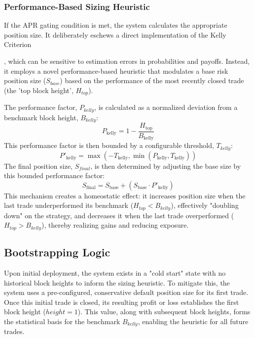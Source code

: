 \documentclass[11pt]{article}
\begin{document}
\subsubsection{Performance-Based Sizing Heuristic}
If the APR gating condition is met, the system calculates the appropriate position size. It deliberately eschews a direct implementation of the Kelly Criterion\cite{kelly1956new}{\cite{tharpinstitute_peak}, which can be sensitive to estimation errors in probabilities and payoffs. Instead, it employs a novel performance-based heuristic that modulates a base risk position size ($S_{base}$) based on the performance of the most recently closed trade (the 'top block height', $H_{top}$).

The performance factor, $P_{kelly}$, is calculated as a normalized deviation from a benchmark block height, $B_{kelly}$:
$$
P_{\text{kelly}} = 1 - \frac{H_{\text{top}}}{B_{\text{kelly}}}
$$
This performance factor is then bounded by a configurable threshold, $T_{kelly}$:
$$
P'_{\text{kelly}} = \max(-T_{\text{kelly}}, \min(P_{\text{kelly}}, T_{\text{kelly}}))
$$
The final position size, $S_{final}$, is then determined by adjusting the base size by this bounded performance factor:
$$
S_{\text{final}} = S_{\text{base}} + (S_{\text{base}} \cdot P'_{\text{kelly}})
$$
This mechanism creates a homeostatic effect: it increases position size when the last trade underperformed its benchmark ($H_{top} < B_{kelly}$), effectively "doubling down" on the strategy, and decreases it when the last trade overperformed ($H_{top} > B_{kelly}$), thereby realizing gains and reducing exposure.

\subsection{Bootstrapping Logic}
Upon initial deployment, the system exists in a "cold start" state with no historical block heights to inform the sizing heuristic. To mitigate this, the system uses a pre-configured, conservative default position size for its first trade. Once this initial trade is closed, its resulting profit or loss establishes the first block height ($height = 1$). This value, along with subsequent block heights, forms the statistical basis for the benchmark $B_{kelly}$, enabling the heuristic for all future trades.

}
\end{document}
